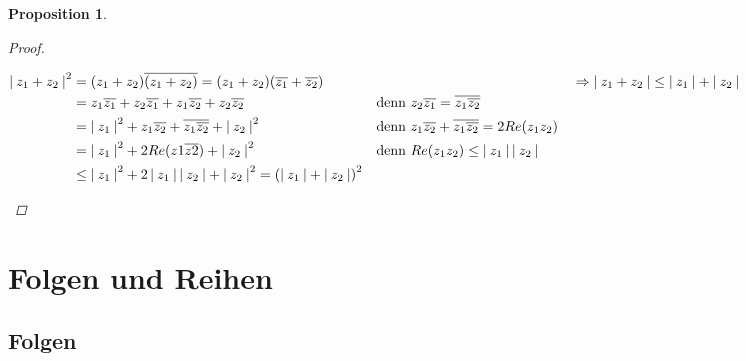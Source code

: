 \documentclass[a4paper,titlepage,oneside]{article}
\newcommand{\abs}[1]{\ensuremath{\left|\:#1\:\right|}}
\theoremstyle{thmstyle}
\newtheorem{prop}[satz]{Proposition}
\begin{document}
\begin{prop}
\begin{proof}
\begin{enumerate}[label=(\roman*)]
\begin{math}
\begin{aligned}[t]
\end{aligned}\\
\begin{aligned}[t]
\abs{z_1 + z_2}^2 &= (z_1 + z_2)\overline{(z_1 + z_2)} = (z_1 + z_2)(\overline{z_1} + \overline{z_2}) \\
&= z_1\overline{z_1} + z_2\overline{z_1} + z_1\overline{z_2} + z_2\overline{z_2} &&\text{denn } z_2\overline{z_1} = \overline{z_1\overline{z_2}} \\
&= \abs{z_1}^2 + z_1\overline{z_2} + \overline{z_1\overline{z_2}} + \abs{z_2}^2 &&\text{denn } z_1\overline{z_2} + \overline{z_1\overline{z_2}} = 2Re(z_1z_2) \\
&= \abs{z_1}^2 + 2 Re(z1 \overline{z2}) + \abs{z_2}^2 &&\text{denn } Re(z_1z_2) \le \abs{z_1}\abs{z_2}\\
&\le  \abs{z_1}^2 + 2\abs{z_1}\abs{z_2} + \abs{z_2}^2 = \left(\abs{z_1} + \abs{z_2}\right)^2
\end{aligned}\\
\Rightarrow \abs{z_1 + z_2} \le \abs{z_1} + \abs{z_2}
\end{math}
\end{enumerate}
\end{proof}
\end{prop}

\section{Folgen und Reihen}
\subsection{Folgen}
\end{document}
